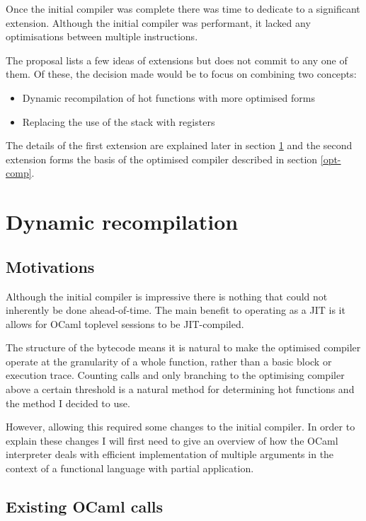 Once the initial compiler was complete there was time to dedicate to a significant extension.
Although the initial compiler was performant, it lacked any optimisations between multiple
instructions.

The proposal lists a few ideas of extensions but does not commit to any one of them. Of these, the
decision made would be to focus on combining two concepts:

\begin{itemize}
      \item Dynamic recompilation of hot functions with more optimised forms
      \item Replacing the use of the stack with registers
\end{itemize}

The details of the first extension are explained later in section \ref{dyn-recomp} and the second
extension forms the basis of the optimised compiler described in section \ref{opt-comp}.

\section{Dynamic recompilation} \label{dyn-recomp}

\subsection{Motivations}

Although the initial compiler is impressive there is nothing that could not inherently be done
ahead-of-time. The main benefit to operating as a JIT is it allows for OCaml toplevel sessions to
be
JIT-compiled.

The structure of the bytecode means it is natural to make the optimised compiler operate at the
granularity of a whole function, rather than a basic block or execution trace.	Counting calls and
only branching to the optimising compiler above a certain threshold is a natural method for
determining hot functions and the method I decided to use.

However, allowing this required some changes to the initial compiler. In order to explain these
changes I will first need to give an overview of how the OCaml interpreter deals with efficient
implementation of multiple arguments in the context of a functional language with partial
application.

\subsection{Existing OCaml calls} \label{exist-ocaml}

